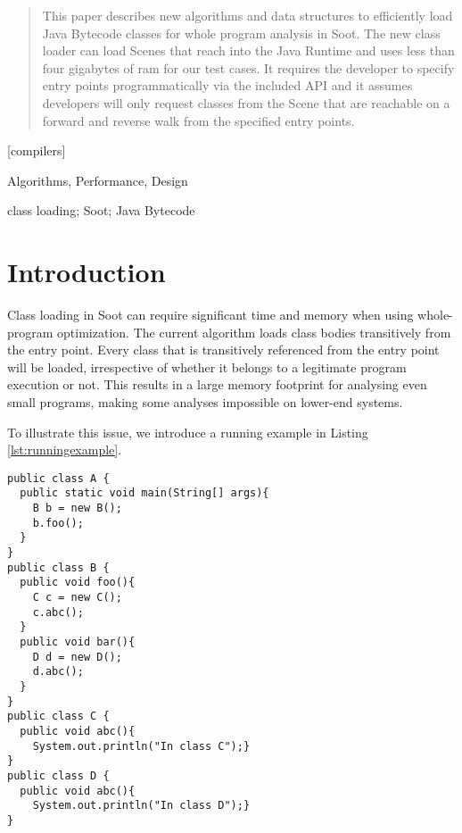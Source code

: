 \documentclass[preprint]{sigplanconf}
\begin{document}
           

\maketitle

\begin{abstract}

This paper describes new algorithms and data structures to efficiently load Java Bytecode classes for whole program analysis in Soot. The new class loader can load Scenes that reach into the Java Runtime and uses less than four gigabytes of ram for our test cases. It requires the developer to specify entry points programmatically via the included API and it assumes developers will only request classes from the Scene that are reachable on a forward and reverse walk from the specified entry points.
\end{abstract}

[compilers]

\terms
Algorithms, Performance, Design

\keywords
class loading; Soot; Java Bytecode

\section{Introduction}
\label{sec:intro}
Class loading in Soot \cite{soot-retro, soot-orig} can require significant time and memory when using whole-program optimization. 
The current algorithm loads class bodies transitively from the entry point. Every class that is transitively referenced from the entry point will be loaded, irrespective of whether it belongs to a legitimate program execution or not. This results in a large memory footprint for analysing even small programs, making some analyses impossible on lower-end systems.

To illustrate this issue, we introduce a running example in Listing \ref{lst:runningexample}.

\begin{lstlisting}[caption={Running example},label={lst:runningexample},float=!ht]
public class A {
  public static void main(String[] args){
    B b = new B();
    b.foo();
  }
}
public class B {
  public void foo(){
    C c = new C();
    c.abc();
  }
  public void bar(){
    D d = new D();
    d.abc();
  }
}
public class C {
  public void abc(){
    System.out.println("In class C");}
}
public class D {
  public void abc(){
    System.out.println("In class D");}
}
\end{lstlisting}
\end{document}
